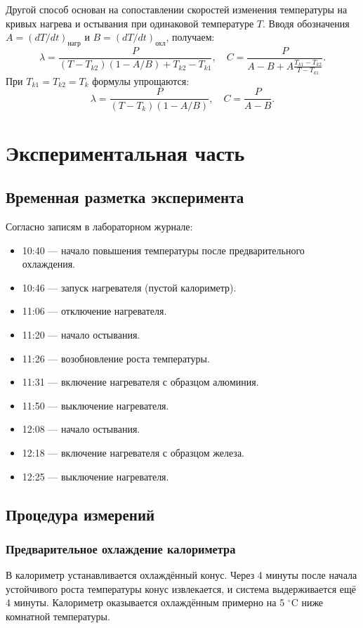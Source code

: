 \documentclass[a4paper,12pt]{article}
\begin{document}
Другой способ основан на сопоставлении скоростей изменения температуры на кривых нагрева и остывания при одинаковой температуре $T$. Вводя обозначения $A = (dT/dt)_{\text{нагр}}$ и $B = (dT/dt)_{\text{охл}}$, получаем:
\begin{equation}
    \lambda = \frac{P}{(T - T_{k2})(1 - A/B) + T_{k2} - T_{k1}}, \quad
    C = \frac{P}{A - B + A \frac{T_{k1} - T_{k2}}{T - T_{k1}}}.
    \label{eq:diff_lambda_C}
\end{equation}
При $T_{k1} = T_{k2} = T_k$ формулы упрощаются:
\begin{equation}
    \lambda = \frac{P}{(T - T_k)(1 - A/B)}, \quad
    C = \frac{P}{A - B}.
    \label{eq:diff_simple}
\end{equation}

\section{Экспериментальная часть}

\subsection{Временная разметка эксперимента}
Согласно записям в лабораторном журнале:
\begin{itemize}
    \item 10:40 — начало повышения температуры после предварительного охлаждения.
    \item 10:46 — запуск нагревателя (пустой калориметр).
    \item 11:06 — отключение нагревателя.
    \item 11:20 — начало остывания.
    \item 11:26 — возобновление роста температуры.
    \item 11:31 — включение нагревателя с образцом алюминия.
    \item 11:50 — выключение нагревателя.
    \item 12:08 — начало остывания.
    \item 12:18 — включение нагревателя с образцом железа.
    \item 12:25 — выключение нагревателя.
\end{itemize}

\subsection{Процедура измерений}

\subsubsection{Предварительное охлаждение калориметра}
В калориметр устанавливается охлаждённый конус. Через 4 минуты после начала устойчивого роста температуры конус извлекается, и система выдерживается ещё 4 минуты. Калориметр оказывается охлаждённым примерно на 5 $^\circ$C ниже комнатной температуры.
\end{document}
